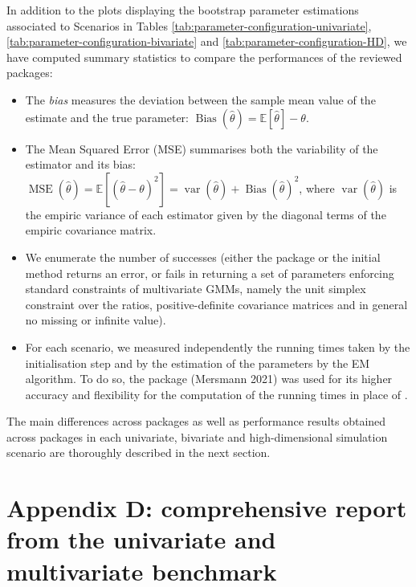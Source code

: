 In addition to the plots displaying the bootstrap parameter estimations associated to Scenarios in Tables \ref{tab:parameter-configuration-univariate}, \ref{tab:parameter-configuration-bivariate} and \ref{tab:parameter-configuration-HD}, we have computed summary statistics to compare the performances of the reviewed packages:

\begin{itemize}
\item
  The \emph{bias} measures the deviation between the sample mean value of the
  estimate and the true parameter:
  \(\operatorname{Bias}(\hat{\theta})=\mathbb{E} [\hat{\theta}] - \theta\).
\item
  The Mean Squared Error (MSE) summarises both the variability of the
  estimator and its bias: \(\operatorname{MSE} (\hat{\theta})=\mathbb{E} \left[ (\hat{\theta} - \theta)^2 \right] = \operatorname{var}(\hat{\theta}) + \operatorname{Bias}(\hat{\theta})^2\), where \(\operatorname{var}(\hat{\theta})\) is the empiric variance of each
  estimator given by the diagonal terms of the empiric covariance matrix.
\item
  We enumerate the number of successes (either the package or the initial method returns an error, or fails in returning a set of parameters enforcing standard constraints of multivariate GMMs, namely the unit simplex constraint over the ratios, positive-definite covariance matrices and in general no missing or infinite value).
\item
  For each scenario, we measured independently the running times taken by the initialisation step and by the estimation of the parameters by the EM
  algorithm. To do so, the  package
  (Mersmann 2021) was used for its higher accuracy and flexibility for
  the computation of the running times in place of .
\end{itemize}

The main differences across packages as well as performance results obtained across packages in each univariate, bivariate and high-dimensional simulation scenario are thoroughly described in the next section.

\hypertarget{appendix-d-comprehensive-report-from-the-univariate-and-multivariate-benchmark}{%
\section{Appendix D: comprehensive report from the univariate and multivariate benchmark}\label{appendix-d-comprehensive-report-from-the-univariate-and-multivariate-benchmark}}

